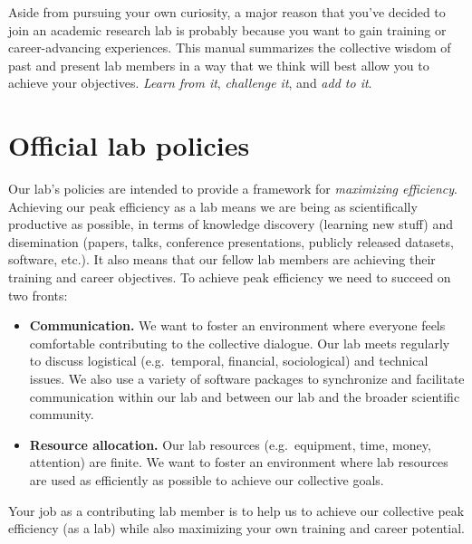 \documentclass{tufte-book} %
\begin{document}
Aside from pursuing your own curiosity, a major reason that you've
decided to join an academic research lab is probably because you want
to gain training or career-advancing experiences.  This manual
summarizes the collective wisdom of past and present lab members in a
way that we think will best allow you to achieve your objectives.
\textit{Learn from it}, \textit{challenge it}, and \textit{add to it}.



\chapter{Official lab policies}\label{ch:policy}
Our lab's policies are intended to provide a framework for
\textit{maximizing efficiency}.  Achieving our peak efficiency as a
lab means we are being as scientifically productive as possible, in terms of knowledge
discovery (learning new stuff) and disemination (papers, talks,
conference presentations, publicly released datasets, software,
etc.). It also means that our fellow lab members are achieving their
training and career objectives.  To achieve peak efficiency we need to
succeed on two fronts:
\begin{itemize}
\item \textbf{Communication.}  We want to foster an environment where
  everyone feels comfortable contributing to the collective dialogue.
  Our lab meets regularly to discuss logistical (e.g.\ temporal, financial,
  sociological) and technical issues.  We also use a variety of
  software packages to synchronize and facilitate communication within
  our lab and between our lab and the broader scientific community.
\item \textbf{Resource allocation.}  Our lab resources (e.g.\
  equipment, time, money, attention) are finite.  We want to foster an
  environment where lab resources are used as efficiently as possible
  to achieve our collective goals.
\end{itemize}
Your job as a contributing lab member is to help us to achieve our 
collective peak efficiency (as a lab) while also maximizing your own training and
career potential.

\newpage
\end{document}
